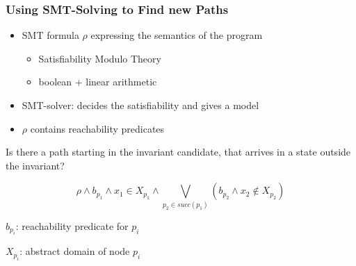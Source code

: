 \documentclass{beamer}
\begin{document}
\begin{frame}
\begin{columns}
\begin{column}{5.5cm}
{
}
\end{column}
\end{columns}
\end{frame}

\begin{frame}
  \frametitle{Using SMT-Solving to Find new Paths}
\begin{itemize}
\item SMT formula $\rho$ expressing the semantics of the program
\begin{itemize}
\item Satisfiability Modulo Theory
\item boolean + linear arithmetic
\end{itemize}
\item SMT-solver: decides the satisfiability and gives a model
\item $\rho$ contains reachability predicates
\end{itemize}
\bigskip
\begin{center}
Is there a path starting in the invariant candidate, that arrives in a
state outside the invariant?
\end{center}
\bigskip 
$$\rho  \wedge b_{p_1} \wedge x_1 \in X_{p_1} \wedge \bigvee_{p_2 \in succ(p_1)}
 (b_{p_2} \wedge x_2 \notin X_{p_2})$$

\footnotesize{
$b_{p_i}$: reachability predicate for $p_i$

$X_{p_i}$: abstract domain of node $p_i$
}
\end{frame}
\end{document}
